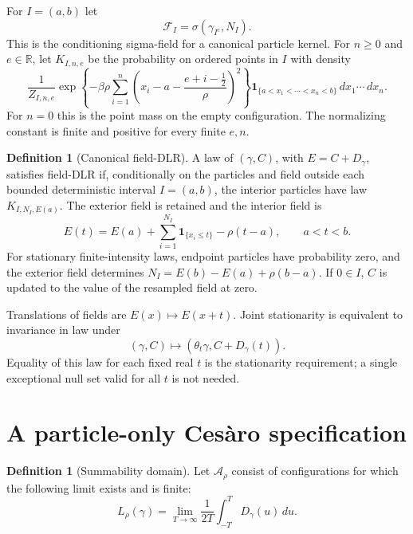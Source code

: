 \documentclass[11pt,reqno]{amsart}
\theoremstyle{definition}
\newtheorem{definition}[theorem]{Definition}
\theoremstyle{remark}
\newcommand{\R}{\mathbb R}
\newcommand{\1}{\mathbf 1}
\newcommand{\dd}{\,d}
\newcommand{\cF}{\mathcal F}
\newcommand{\cA}{\mathcal A}
\numberwithin{equation}{section}
\begin{document}
For $I=(a,b)$ let
\[
\cF_I=\sigma(\gamma_{I^c},N_I).
\]
This is the conditioning sigma-field for a canonical particle kernel.
For $n\ge0$ and $e\in\R$, let $K_{I,n,e}$ be the probability on
ordered points in $I$ with density
\begin{equation}\label{eq:gaussian-kernel}
\frac1{Z_{I,n,e}}\exp\left\{-\beta\rho\sum_{i=1}^n
\left(x_i-a-\frac{e+i-\frac12}{\rho}\right)^2\right\}
\1_{\{a<x_1<\cdots<x_n<b\}}\dd x_1\cdots\dd x_n.
\end{equation}
For $n=0$ this is the point mass on the empty configuration. The
normalizing constant is finite and positive for every finite $e,n$.

\begin{definition}[Canonical field-DLR]\label{def:field-dlr}
A law of $(\gamma,C)$, with $E=C+D_\gamma$, satisfies field-DLR if,
conditionally on the particles and field outside each bounded
deterministic interval $I=(a,b)$, the interior particles have law
$K_{I,N_I,E(a)}$. The exterior field is retained and the interior field is
\begin{equation}\label{eq:dlr}
E(t)=E(a)+\sum_{i=1}^{N_I}\1_{\{x_i\le t\}}-\rho(t-a),
\qquad a<t<b.
\end{equation}
For stationary finite-intensity laws, endpoint particles have probability
zero, and the exterior field determines $N_I=E(b)-E(a)+\rho(b-a)$.
If $0\in I$, $C$ is updated to the value of the resampled field at zero.
\end{definition}

Translations of fields are $E(x)\mapsto E(x+t)$. Joint stationarity is
equivalent to invariance in law under
\[
(\gamma,C)\mapsto(\theta_t\gamma,C+D_\gamma(t)).
\]
Equality of this law for each fixed real $t$ is the stationarity
requirement; a single exceptional null set valid for all $t$ is not
needed.

\section{A particle-only Ces\`aro specification}\label{sec:spec}

\begin{definition}[Summability domain]\label{def:domain}
Let $\cA_\rho$ consist of configurations for which the following limit
exists and is finite:
\begin{equation}\label{eq:cesaro}
L_\rho(\gamma)=\lim_{T\to\infty}\frac1{2T}
\int_{-T}^T D_\gamma(u)\dd u.
\end{equation}
\end{definition}
\end{document}

